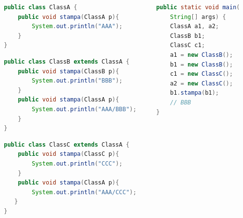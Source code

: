 \documentclass{beamer}
\begin{document}
\begin{frame}[fragile]
\begin{columns}
\begin{column}{0.6\textwidth}
\begin{lstlisting}[language=Java,escapechar=|]
public class ClassA {
    public void stampa(ClassA p){
        System.out.println("AAA");
    }
}
\end{lstlisting}
\begin{lstlisting}[language=Java,escapechar=|]
public class ClassB extends ClassA {
    public void stampa(ClassB p){
        System.out.println("BBB");
    }
    public void stampa(ClassA p){
        System.out.println("AAA/BBB");
    }
}
\end{lstlisting}
\begin{lstlisting}[language=Java,escapechar=|]
public class ClassC extends ClassA {
    public void stampa(ClassC p){
        System.out.println("CCC");
    }
    public void stampa(ClassA p){
        System.out.println("AAA/CCC");
   }
}
\end{lstlisting}
\end{column}
\begin{column}{0.4\textwidth}
\begin{lstlisting}[language=Java,escapechar=|]
public static void main(
    String[] args) {
    ClassA a1, a2;
    ClassB b1;
    ClassC c1;
    a1 = new ClassB();
    b1 = new ClassB();
    c1 = new ClassC();
    a2 = new ClassC();
    b1.stampa(b1); 
    // BBB
}
\end{lstlisting}
\end{column}
\end{columns}
\end{frame}
\end{document}
